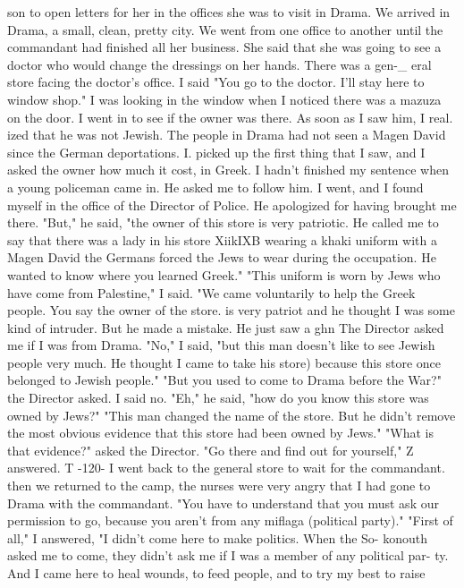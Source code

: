 son to open letters for her in the offices she was to visit in Drama. 
We arrived in Drama, a small, clean, pretty city. We went from one office to 
another until the commandant had finished all her business. She said that she was 
going to see a doctor who would change the dressings on her hands. There was a gen-_ 
eral store facing the doctor's office. I said "You go to the doctor. I'll stay 
here to window shop." I was looking in the window when I noticed there was a mazuza 
on the door. I went in to see if the owner was there. As soon as I saw him, I real. 
ized that he was not Jewish. 
The people in Drama had not seen a Magen David since the German deportations. 
I. picked up the first thing that I saw, and I asked the owner how much it cost, in 
Greek. I hadn't finished my sentence when a young policeman came in. He asked me 
to follow him. I went, and I found myself in the office of the Director of Police. 
He apologized for having brought me there. 
"But," he said, "the owner of this store is very patriotic. He called me to say 
that there was a lady in his store XiikIXB wearing a khaki uniform with a Magen David 
the Germans forced the Jews to wear during the occupation. He wanted to know where 
you learned Greek." 
"This uniform is worn by Jews who have come from Palestine," I said. "We came 
voluntarily to help the Greek people. You say the owner of the store. is very patriot 
and he thought I was some kind of intruder. But he made a mistake. He just saw a ghn 
The Director asked me if I was from Drama. "No," I said, "but this man doesn't 
like to see Jewish people very much. He thought I came to take his store) because 
this store once belonged to Jewish people." 
"But you used to come to Drama before the War?" the Director asked. I said no. 
"Eh," he said, "how do you know this store was owned by Jews?" 
"This man changed the name of the store. But he didn't remove the most obvious 
evidence that this store had been owned by Jews." 
"What is that evidence?" asked the Director. 
"Go there and find out for yourself," Z answered. 
T 
-120- 
I went back to the general store to wait for the commandant. 
then we returned to the camp, the nurses were very angry that I had gone to 
Drama with the commandant. "You have to understand that you must ask our permission 
to go, because you aren't from any miflaga (political party)." 
"First of all," I answered, "I didn't come here to make politics. When the So-
konouth asked me to come, they didn't ask me if I was a member of any political par-
ty. And I came here to heal wounds, to feed people, and to try my best to raise 
